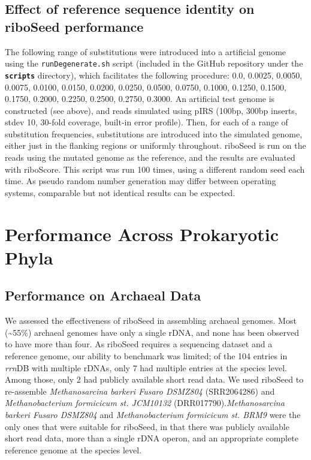 \documentclass[10pt]{article}
\def \ttilde {\raisebox{-.5ex}\textasciitilde} %
\begin{document}
\subsection*{Effect of reference sequence identity on riboSeed performance}
The following range of substitutions were introduced into a artificial genome using the \texttt{runDegenerate.sh} script (included in the GitHub repository under the \textbf{\texttt{scripts}} directory), which facilitates the following procedure: 0.0, 0.0025, 0.0050, 0.0075, 0.0100, 0.0150, 0.0200, 0.0250, 0.0500, 0.0750, 0.1000, 0.1250, 0.1500, 0.1750, 0.2000, 0.2250, 0.2500, 0.2750, 0.3000. An artificial test genome is constructed (see above), and reads simulated using pIRS (100bp, 300bp inserts, stdev 10, 30-fold coverage, built-in error profile).  Then, for each of a range of substitution frequencies, substitutions are introduced into the simulated genome, either just in the flanking regions or uniformly throughout. riboSeed is run on the reads using the mutated genome as the reference, and the results are evaluated with riboScore. This script was run 100 times, using a different random seed each time.  As pseudo random number generation may differ between operating systems, comparable but not identical results can be expected.

\section*{Performance Across Prokaryotic Phyla}
\subsection*{Performance on Archaeal Data}

We assessed the effectiveness of riboSeed in assembling archaeal genomes. Most (\ttilde55\%) archaeal genomes have only a single rDNA, and none has been observed to have more than four. As riboSeed requires a sequencing dataset and a reference genome, our ability to benchmark was limited; of the 104 entries in \textit{rrn}DB with multiple rDNAs, only 7 had multiple entries at the species level. Among those, only 2 had publicly available short read data. We used riboSeed to re-assemble \textit{Methanosarcina barkeri Fusaro DSMZ804} (SRR2064286) and \textit{Methanobacterium formicicum st. JCM10132} (DRR017790).\textit{Methanosarcina barkeri Fusaro DSMZ804} and  \textit{Methanobacterium formicicum st. BRM9}  were the only ones that were suitable for riboSeed, in that there was publicly available short read data, more than a single rDNA operon, and an appropriate complete reference genome at the species level.
\end{document}
